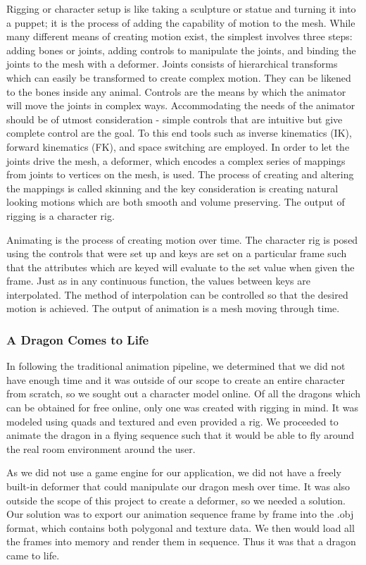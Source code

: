Rigging or character setup is like taking a sculpture or statue and turning it into a puppet; it is the process of adding the capability of motion to the mesh. While many different means of creating motion exist, the simplest involves three steps: adding bones or joints, adding controls to manipulate the joints, and binding the joints to the mesh with a deformer. Joints consists of hierarchical transforms which can easily be transformed to create complex motion. They can be likened to the bones inside any animal. Controls are the means by which the animator will move the joints in complex ways. Accommodating the needs of the animator should be of utmost consideration - simple controls that are intuitive but give complete control are the goal. To this end tools such as inverse kinematics (IK), forward kinematics (FK), and space switching are employed. In order to let the joints drive the mesh, a deformer, which encodes a complex series of mappings from joints to vertices on the mesh, is used. The process of creating and altering the mappings is called skinning and the key consideration is creating natural looking motions which are both smooth and volume preserving. The output of rigging is a character rig.

Animating is the process of creating motion over time. The character rig is posed using the controls that were set up and keys are set on a particular frame such that the attributes which are keyed will evaluate to the set value when given the frame. Just as in any continuous function, the values between keys are interpolated. The method of interpolation can be controlled so that the desired motion is achieved. The output of animation is a mesh moving through time.

\subsubsection{A Dragon Comes to Life}
In following the traditional animation pipeline, we determined that we did not have enough time and it was outside of our scope to create an entire character from scratch, so we sought out a character model online. Of all the dragons which can be obtained for free online, only one was created with rigging in mind. It was modeled using quads and textured and even provided a rig\cite{dragon}. We proceeded to animate the dragon in a flying sequence such that it would be able to fly around the real room environment around the user.

As we did not use a game engine for our application, we did not have a freely built-in deformer that could manipulate our dragon mesh over time. It was also outside the scope of this project to create a deformer, so we needed a solution. Our solution was to export our animation sequence frame by frame into the .obj format, which contains both polygonal and texture data. We then would load all the frames into memory and render them in sequence. Thus it was that a dragon came to life.
